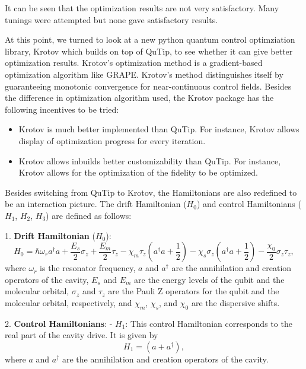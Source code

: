 \documentclass[12pt]{report}
\begin{document}
It can be seen that the optimization results are not very satisfactory. 
Many tunings were attempted but none gave satisfactory results.
\par
At this point, we turned to look at a new python quantum control optimziation library, Krotov which builds on top of QuTip,
to see whether it can give better optimization results. Krotov’s optimization method is a gradient-based optimization algorithm like GRAPE. 
Krotov’s method distinguishes itself by guaranteeing monotonic convergence for near-continuous control fields. 
Besides the difference in optimization algorithm used, the Krotov package has the following incentives to be tried: 
\begin{itemize}
    \item Krotov is much better implemented than QuTip. For instance, Krotov allows display of optimization progress for every iteration. 
    \item Krotov allows inbuilds better customizability than QuTip. 
            For instance, Krotov allows for the optimization of the fidelity to be optimized.
\end{itemize}

Besides switching from QuTip to Krotov, the Hamiltonians are also redefined to be an interaction picture. 
The drift Hamiltonian ($H_0$) and control Hamiltonians ($H_1$, $H_2$, $H_3$) are defined as follows:

1. \textbf{Drift Hamiltonian} ($H_0$):
\begin{equation}
H_0 = \hbar \omega_r a^\dagger a + \frac{E_s}{2} \sigma_z + \frac{E_m}{2} \tau_z - \chi_m \tau_z \left(a^\dagger a + \frac{1}{2}\right) - \chi_s \sigma_z \left(a^\dagger a + \frac{1}{2}\right) - \frac{\chi_0}{2} \sigma_z \tau_z,
\end{equation}
where $\omega_r$ is the resonator frequency, $a$ and $a^\dagger$ are the annihilation and creation operators of the cavity, $E_s$ and $E_m$ are the energy levels of the qubit and the molecular orbital, $\sigma_z$ and $\tau_z$ are the Pauli Z operators for the qubit and the molecular orbital, respectively, and $\chi_m$, $\chi_s$, and $\chi_0$ are the dispersive shifts.

2. \textbf{Control Hamiltonians}:
   - $H_1$: This control Hamiltonian corresponds to the real part of the cavity drive. It is given by
     \begin{equation}
     H_1 = \left(a + a^\dagger\right),
     \end{equation}
     where $a$ and $a^\dagger$ are the annihilation and creation operators of the cavity.
\end{document}
